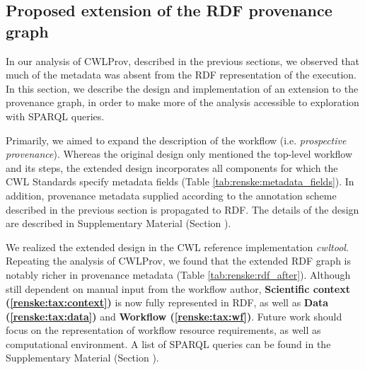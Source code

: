\subsection{Proposed extension of the RDF provenance graph}
\label{sec:renske:prov_rdf_extension}
In our analysis of CWLProv, described in the previous sections, we observed that much of the metadata was absent from the RDF representation of the execution. In this section, we describe the design and implementation of an extension to the provenance graph, in order to make more of the analysis accessible to exploration with SPARQL queries. 



Primarily, we aimed to expand the description of the workflow (i.e. \emph{prospective provenance}). Whereas the original design only mentioned the top-level workflow and its steps, the extended design incorporates all components for which the CWL Standards specify metadata fields (Table \ref{tab:renske:metadata_fields}). In addition, provenance metadata supplied according to the annotation scheme described in the previous section is propagated to RDF. The details of the design are described in Supplementary Material (Section \emph{}). 

We  realized the extended design in the CWL reference implementation \emph{cwltool}. Repeating the analysis of CWLProv, we found that the extended RDF graph is notably richer in provenance metadata (Table \ref{tab:renske:rdf_after}). Although still dependent on manual input from the workflow author, \textbf{Scientific context (\ref{renske:tax:context})} is now fully represented in RDF, as well as \textbf{Data (\ref{renske:tax:data})} and \textbf{Workflow (\ref{renske:tax:wf})}. Future work should focus on the representation of workflow resource requirements, as well as computational environment. A list of SPARQL queries 
can be found in the Supplementary Material (Section \emph{}). 




%


% 

% 
